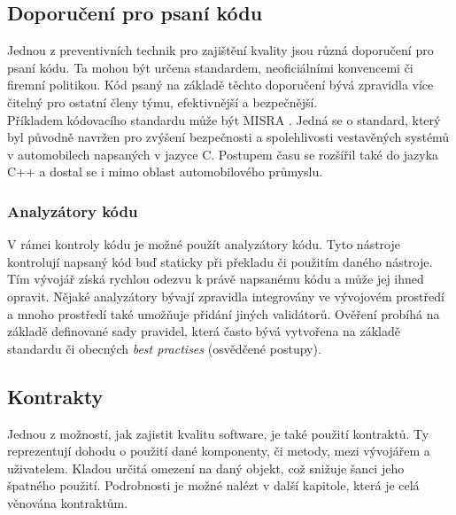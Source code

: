	
	\subsection{Doporučení pro psaní kódu}
		Jednou z preventivních technik pro zajištění kvality jsou různá doporučení pro psaní kódu. Ta mohou být určena standardem, neoficiálními konvencemi či firemní politikou. Kód psaný na základě těchto doporučení bývá zpravidla více čitelný pro ostatní členy týmu, efektivnější a bezpečnější.\\
		
		Příkladem kódovacího standardu může být MISRA \cite{misra}. Jedná se o standard, který byl původně navržen pro zvýšení bezpečnosti a spolehlivosti vestavěných systémů v automobilech napsaných v jazyce C. Postupem času se rozšířil také do jazyka C++ a dostal se i mimo oblast automobilového průmyslu. 		
		
		\subsubsection{Analyzátory kódu}
			V rámci kontroly kódu je možné použít analyzátory kódu. Tyto nástroje kontrolují napsaný kód buď staticky při překladu či použitím daného nástroje. Tím vývojář získá rychlou odezvu k právě napsanému kódu a může jej ihned opravit. Nějaké analyzátory bývají zpravidla integrovány ve vývojovém prostředí a mnoho prostředí také umožňuje přidání jiných validátorů. Ověření probíhá na základě definované sady pravidel, která často bývá vytvořena na základě standardu či obecných \emph{best practises} (osvědčené postupy).
	
	\subsection{Kontrakty}
		Jednou z možností, jak zajistit kvalitu software, je také použití kontraktů. Ty reprezentují dohodu o použití dané komponenty, či metody, mezi vývojářem a uživatelem. Kladou určitá omezení na daný objekt, což snižuje šanci jeho špatného použití. Podrobnosti je možné nalézt v další kapitole, která je celá věnována kontraktům.